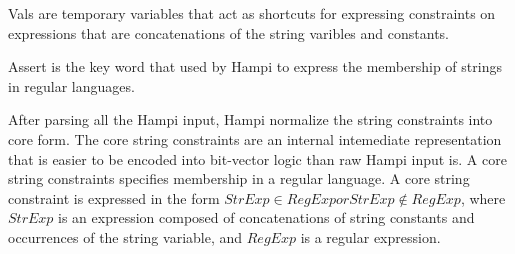 Vals are temporary variables that act as shortcuts for expressing constraints on expressions that are concatenations of the string varibles and constants.

Assert is the key word that used by Hampi to express the membership of strings in regular languages.

After parsing all the Hampi input, Hampi normalize the string constraints into core form. The core string constraints are an internal intemediate representation that is easier to be encoded into bit-vector logic than raw Hampi input is. A core string constraints specifies membership in a regular language. A core string constraint is expressed in the form $StrExp\in RegExp or StrExp\notin RegExp$, where $StrExp$ is an expression composed of concatenations of string constants and occurrences of the string variable, and $RegExp$ is a regular expression.

